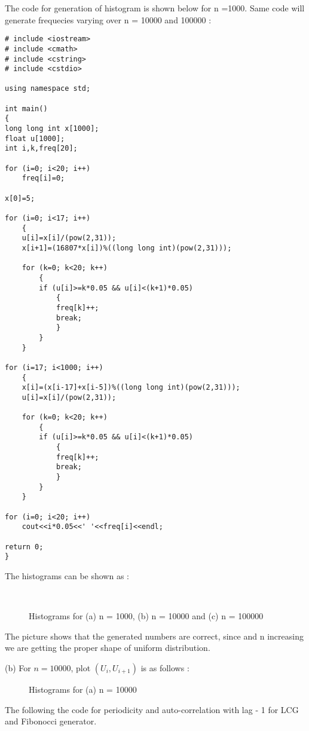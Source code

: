 \documentclass[11pt]{article}
\begin{document}
The code for generation of histogram is shown below for n =1000.  Same code will generate frequecies varying over n = 10000 and 100000 :

\begin{lstlisting}
# include <iostream>
# include <cmath>
# include <cstring>
# include <cstdio>

using namespace std;

int main()
{
long long int x[1000];
float u[1000];
int i,k,freq[20];

for (i=0; i<20; i++)
	freq[i]=0;

x[0]=5;
	
for (i=0; i<17; i++)
	{
	u[i]=x[i]/(pow(2,31));
	x[i+1]=(16807*x[i])%((long long int)(pow(2,31)));

	for (k=0; k<20; k++)
		{
		if (u[i]>=k*0.05 && u[i]<(k+1)*0.05)
			{
			freq[k]++;
			break;
			}
		}
	}

for (i=17; i<1000; i++)
	{
	x[i]=(x[i-17]+x[i-5])%((long long int)(pow(2,31)));	
	u[i]=x[i]/(pow(2,31));

	for (k=0; k<20; k++)
		{
		if (u[i]>=k*0.05 && u[i]<(k+1)*0.05)
			{
			freq[k]++;
			break;
			}
		}
	}

for (i=0; i<20; i++)
	cout<<i*0.05<<' '<<freq[i]<<endl;

return 0;
}
\end{lstlisting}

The histograms can be shown as :
\begin{figure}[H]
  \centering
  \\
    \caption{Histograms for (a) n = 1000, (b) n = 10000 and (c) n = 100000}
\end{figure}

 The picture shows that the generated numbers are correct, since and n increasing we are getting the proper shape of uniform distribution.

(b) For $n = 10000$, plot $(U_i , U_{i+1})$ is as follows :

\begin{figure}[H]
  \centering
      \caption{Histograms for (a) n = 10000}
\end{figure}
 

  The following the code for periodicity and auto-correlation with lag - 1 for LCG and Fibonocci generator. 
\end{document}
